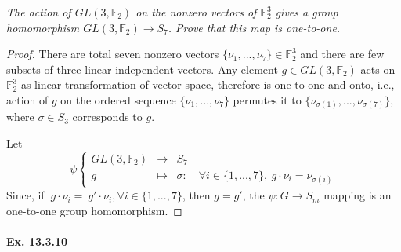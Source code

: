 \documentclass[11pt,a4paper]{article}
\begin{document}
{\it The action of $GL(3,\mathbb{F}_2)$ on the nonzero vectors of $\mathbb{F}_2^3$ gives a group homomorphism $GL(3,\mathbb{F}_2) \rightarrow S_7$. Prove that this map is one-to-one. 

\begin{proof}
There are total seven nonzero vectors $\{\nu_1,...,\nu_7\}\in \mathbb{F}_2^3$ and there are few subsets of three linear independent vectors. Any element $g \in GL(3,\mathbb{F}_2)$ acts on $\mathbb{F}_2^3$ as linear transformation of vector space, therefore is one-to-one and onto, i.e., action of $g$ on the ordered sequence $\{\nu_1,...,\nu_7\}$ permutes it to $\{\nu_{\sigma(1)},...,\nu_{\sigma(7)}\}$, where $\sigma \in S_3$ corresponds to $g$.

Let 
$$
\psi 
\left\{
\begin{array}{ccl}
  GL(3,\mathbb{F}_2)& \to  &  S_7 \\
  g& \mapsto  &   \sigma : \quad \forall i \in \{ 1,...,7\}, \ g \cdot \nu_i = \nu_{\sigma(i)}   
\end{array}
\right.
$$
Since, if $\ g \cdot \nu_i =\ g' \cdot \nu_i,\forall i \in \{ 1,...,7\} $, then $g=g'$, the $\psi:G \to S_m$ mapping is an one-to-one group homomorphism.
\end{proof}
}

\paragraph{Ex. 13.3.10}
\end{document}
